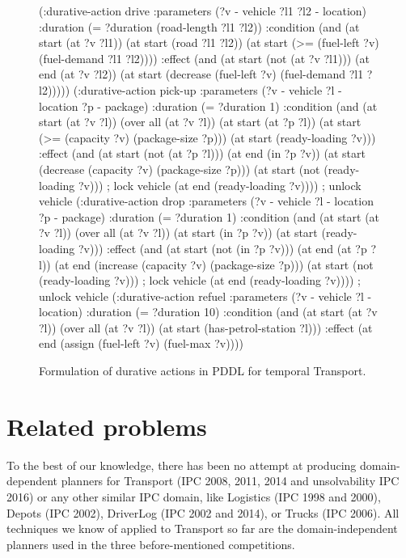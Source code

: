 \begin{figure}[tbp]
\begin{code}
(:durative-action drive
  :parameters (?v - vehicle ?l1 ?l2 - location)
  :duration (= ?duration (road-length ?l1 ?l2))
  :condition (and
      (at start (at ?v ?l1))
      (at start (road ?l1 ?l2))
      (at start (>= (fuel-left ?v) (fuel-demand ?l1 ?l2))))
  :effect (and
      (at start (not (at ?v ?l1)))
      (at end (at ?v ?l2))
      (at start (decrease (fuel-left ?v) (fuel-demand ?l1 ?l2)))))
(:durative-action pick-up
  :parameters (?v - vehicle ?l - location ?p - package)
  :duration (= ?duration 1)
  :condition (and
      (at start (at ?v ?l))
      (over all (at ?v ?l))
      (at start (at ?p ?l))
      (at start (>= (capacity ?v) (package-size ?p)))
      (at start (ready-loading ?v)))
  :effect (and
      (at start (not (at ?p ?l)))
      (at end (in ?p ?v))
      (at start (decrease (capacity ?v) (package-size ?p)))
      (at start (not (ready-loading ?v))) ; lock vehicle
      (at end (ready-loading ?v)))) ; unlock vehicle
(:durative-action drop
  :parameters (?v - vehicle ?l - location ?p - package)
  :duration (= ?duration 1)
  :condition (and
      (at start (at ?v ?l))
      (over all (at ?v ?l))   
      (at start (in ?p ?v))
      (at start (ready-loading ?v)))
  :effect (and (at start (not (in ?p ?v)))
      (at end (at ?p ?l))
      (at end (increase (capacity ?v) (package-size ?p)))
      (at start (not (ready-loading ?v))) ; lock vehicle
      (at end (ready-loading ?v)))) ; unlock vehicle
(:durative-action refuel
  :parameters (?v - vehicle ?l - location)
  :duration (= ?duration 10)
  :condition (and
      (at start (at ?v ?l))
      (over all (at ?v ?l))
      (at start (has-petrol-station ?l)))
  :effect
      (at end (assign (fuel-left ?v) (fuel-max ?v))))
\end{code}
\caption{Formulation of durative actions in PDDL for temporal Transport.}
\label{code:pddl-temporal}
\end{figure}
















\section{Related problems}

To the best of our knowledge, there has been no attempt at producing domain-dependent planners
for Transport (IPC 2008, 2011, 2014 and unsolvability IPC 2016) or any other similar IPC domain, like Logistics (IPC 1998 and 2000),
Depots (IPC 2002),
DriverLog (IPC 2002 and 2014),
or Trucks (IPC 2006).
All techniques we know of applied to Transport so far are the
domain-independent planners used in the three before-mentioned competitions.

